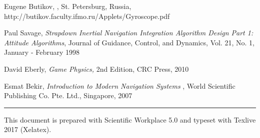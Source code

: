 \documentclass[12pt,a4paper]{article}
\begin{document}
\begin{thebibliography}{99}
 Eugene Butikov, \href{http://butikov.faculty.ifmo.ru/Applets/Gyroscope.pdf%
}{\underline{\color{blue}}},
St. Petersburg, Russia, http://butikov.faculty.ifmo.ru/Applets/Gyroscope.pdf

 Paul Savage, \emph{Strapdown Inertial Navigation
Integration Algorithm Design Part 1: Attitude Algorithms}, Journal of
Guidance, Control, and Dynamics, Vol. 21, No. 1, January - February 1998

 David Eberly, \emph{Game Physics,} 2nd Edition, CRC Press,
2010

 Esmat Bekir, \emph{Introduction to Modern Navigation Systems}%
, World Scientific Publishing Co. Pte. Ltd., Singapore, 2007
\end{thebibliography}

\bigskip

\null
\vfill

\begin{center}
\rule{6in}{0.01in}
\end{center}

\noindent This document is prepared with Scientific Workplace 5.0 and
typeset with Texlive 2017 (Xelatex).

\noindent\href{http://whymranderson.blogspot.tw/2014/03/how-to-convert-swp-50-special-unicode.html%
}{\underline{\color{blue}}}

\noindent\href{https://drive.google.com/file/d/0B96HmLH-SQVmM1dvYlFiQm9ESGM/edit?usp=sharing%
}{\underline{\color{blue}%
%
}}

\bigskip

%
\end{document}
